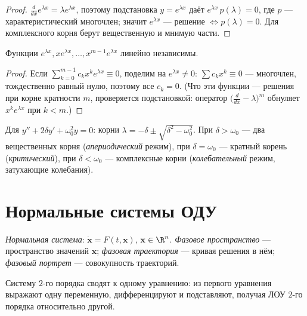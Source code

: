 \begin{proof}
$\frac{d}{dx}e^{\lambda x}=\lambda e^{\lambda x}$, поэтому подстановка $y=e^{\lambda x}$ даёт
$e^{\lambda x}\,p(\lambda)=0$, где $p$ — характеристический многочлен; значит $e^{\lambda x}$ —
решение $\iff p(\lambda)=0$. Для комплексного корня берут вещественную и мнимую части.
\end{proof}

\begin{theorem}
Функции $e^{\lambda x},xe^{\lambda x},\dots,x^{m-1}e^{\lambda x}$ линейно независимы.
\end{theorem}

\begin{proof}
Если $\sum_{k=0}^{m-1}c_k x^k e^{\lambda x}\equiv0$, поделим на $e^{\lambda x}\ne0$:
$\sum c_k x^k\equiv0$ — многочлен, тождественно равный нулю, поэтому все $c_k=0$. (Что эти функции —
решения при корне кратности $m$, проверяется подстановкой: оператор $\bigl(\tfrac{d}{dx}-\lambda\bigr)^m$
обнуляет $x^k e^{\lambda x}$ при $k<m$.)
\end{proof}

\begin{remark}
Для $y''+2\delta y'+\omega_0^2 y=0$: корни $\lambda=-\delta\pm\sqrt{\delta^2-\omega_0^2}$. При
$\delta>\omega_0$ — два вещественных корня (\emph{апериодический} режим), при $\delta=\omega_0$ —
кратный корень (\emph{критический}), при $\delta<\omega_0$ — комплексные корни
(\emph{колебательный} режим, затухающие колебания).
\end{remark}

\section{Нормальные системы ОДУ}

\begin{definition}
\emph{Нормальная система}: $\dot{\mathbf x}=F(t,\mathbf x)$, $\mathbf x\in\R^n$. \emph{Фазовое
пространство} — пространство значений $\mathbf x$; \emph{фазовая траектория} — кривая решения в нём;
\emph{фазовый портрет} — совокупность траекторий.
\end{definition}

\begin{remark}
Систему $2$-го порядка сводят к одному уравнению: из первого уравнения выражают одну переменную,
дифференцируют и подставляют, получая ЛОУ $2$-го порядка относительно другой.
\end{remark}

